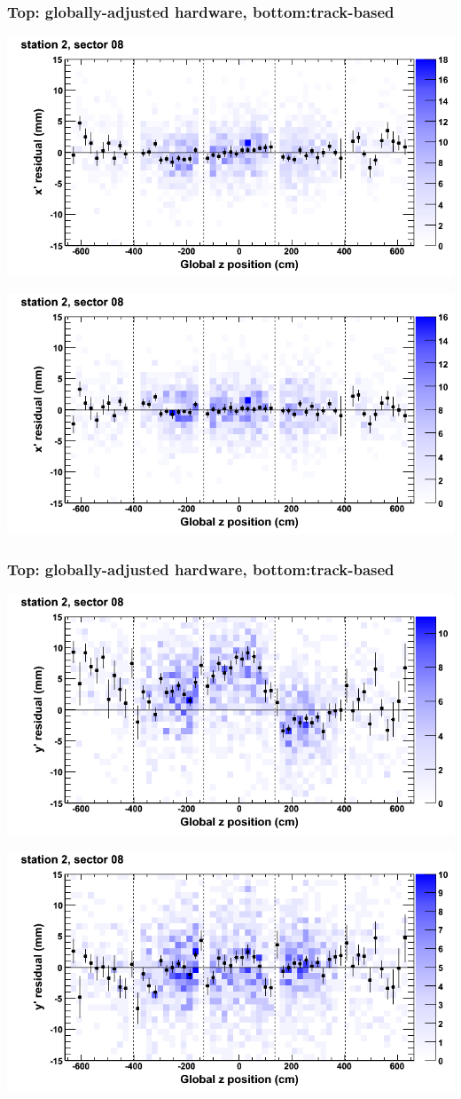 \documentclass[compress]{beamer}
\begin{document}
\begin{frame}
\frametitle{Top: globally-adjusted hardware, bottom:track-based}
\includegraphics[width=0.7\linewidth]{NOV4_mapplots_HW/DTvsz_st2sec08_x.png}

\includegraphics[width=0.7\linewidth]{NOV4_mapplots/DTvsz_st2sec08_x.png}
\end{frame}

\begin{frame}
\frametitle{Top: globally-adjusted hardware, bottom:track-based}
\includegraphics[width=0.7\linewidth]{NOV4_mapplots_HW/DTvsz_st2sec08_y.png}

\includegraphics[width=0.7\linewidth]{NOV4_mapplots/DTvsz_st2sec08_y.png}
\end{frame}
\end{document}
